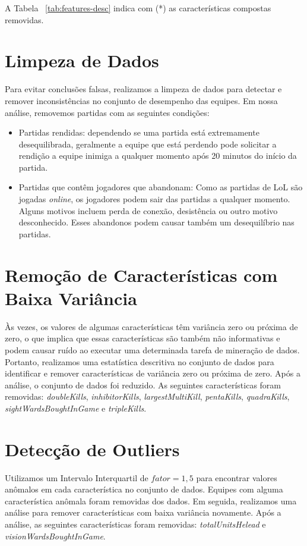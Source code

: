 A Tabela ~\ref{tab:features-desc} indica com (*) as características compostas removidas.

\section{Limpeza de Dados}
Para evitar conclusões falsas, realizamos a limpeza de dados para detectar e remover inconsistências no conjunto de desempenho das equipes. Em nossa análise, removemos partidas com as seguintes condições:

\begin{itemize}
\item Partidas rendidas: dependendo se uma partida está extremamente desequilibrada, geralmente a equipe que está perdendo pode solicitar a rendição a equipe inimiga a qualquer momento após 20 minutos do início da partida.
\item Partidas que contêm jogadores que abandonam: Como as partidas de LoL são jogadas \textit{online}, os jogadores podem sair das partidas a qualquer momento. Alguns motivos incluem perda de conexão, desistência ou outro motivo desconhecido. Esses abandonos podem causar também um desequilíbrio nas partidas.
\end{itemize}

\section{Remoção de Características com Baixa Variância}
Às vezes, os valores de algumas características têm variância zero ou próxima de zero, o que implica que essas características são também não informativas e podem causar ruído ao executar uma determinada tarefa de mineração de dados. Portanto, realizamos uma estatística descritiva no conjunto de dados para identificar e remover características de variância zero ou próxima de zero. Após a análise, o conjunto de dados foi reduzido. As seguintes características foram removidas: \textit{doubleKills}, \textit{inhibitorKills}, \textit {largestMultiKill}, \textit{pentaKills}, \textit {quadraKills}, \textit {sightWardsBoughtInGame} e \textit{tripleKills}.

\section{Detecção de Outliers}
Utilizamos um Intervalo Interquartil de $fator = 1,5$ para encontrar valores anômalos em cada característica no conjunto de dados. Equipes com alguma característica anômala foram removidas dos dados. Em seguida, realizamos uma análise para remover características com baixa variância novamente. Após a análise, as seguintes características foram removidas: \textit{totalUnitsHelead} e \textit{visionWardsBoughtInGame}.

